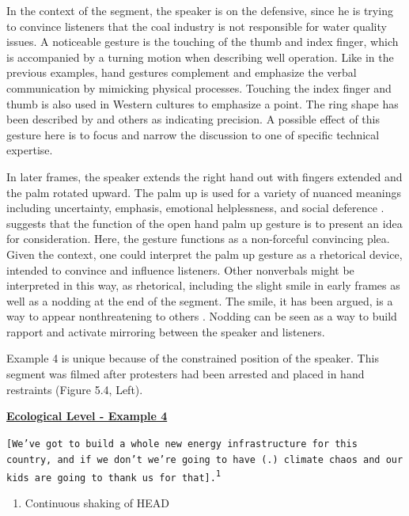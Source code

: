 In the context of the segment, the speaker is on the defensive, since he is trying to convince listeners that the coal industry is not responsible for water quality issues. A noticeable gesture is the touching of the thumb and index finger, which is accompanied by a turning motion when describing well operation. Like in the previous examples, hand gestures complement and emphasize the verbal communication by mimicking physical processes. Touching the index finger and thumb is also used in Western cultures to emphasize a point. The ring shape has been described by \cite{Kendon2004} and others as indicating precision. A possible effect of this gesture here is to focus and narrow the discussion to one of specific technical expertise.

In later frames, the speaker extends the right hand out with fingers extended and the palm rotated upward. The palm up is used for a variety of nuanced meanings including uncertainty, emphasis, emotional helplessness, and social deference \citep{GivensDavidB2016}. \cite{Muller2004} suggests that the function of the open hand palm up gesture is to present an idea for consideration. Here, the gesture functions as a non-forceful convincing plea. Given the context, one could interpret the palm up gesture as a rhetorical device, intended to convince and influence listeners. Other nonverbals might be interpreted in this way, as rhetorical, including the slight smile in early frames as well as a nodding at the end of the segment. The smile, it has been argued, is a way to appear nonthreatening to others \citep{Cunningham2004}. Nodding can be seen as a way to build rapport and activate mirroring between the speaker and listeners.

Example 4 is unique because of the constrained position of the speaker. This segment was filmed after protesters had been arrested and placed in hand restraints (Figure 5.4, Left). 

\textbf{\underline{Ecological Level - Example 4}}

\begin{footnotesize}
\texttt{[We've got to build a whole new energy infrastructure for this country, and if we don't we're going to have (.) climate chaos and our kids are going to  thank us for that].\textsuperscript{1}}
\end{footnotesize}

\begin{footnotesize}
\begin{enumerate}
   \item Continuous shaking of HEAD
\end{enumerate}
\end{footnotesize}

